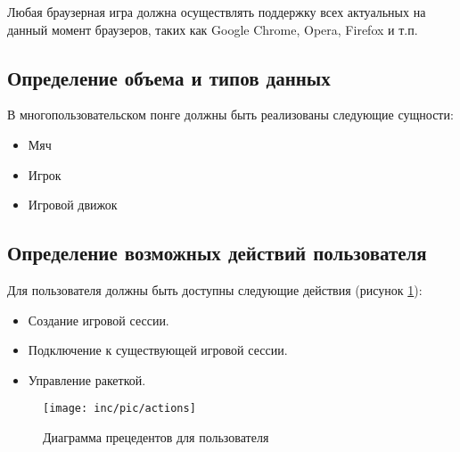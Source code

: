 Любая браузерная игра должна осуществлять поддержку всех актуальных на данный момент браузеров, таких как Google Chrome, Opera, Firefox и т.п.

\subsection{Определение объема и типов данных}

В многопользовательском понге должны быть реализованы следующие сущности:

\begin{itemize}
	\item Мяч
	\item Игрок
	\item Игровой движок
\end{itemize}

\subsection{Определение возможных действий пользователя}

Для пользователя должны быть доступны следующие действия (рисунок \ref{actions}):

\begin{itemize}
	\item Создание игровой сессии.
	\item Подключение к существующей игровой сессии.
	\item Управление ракеткой.
\end{itemize}

\begin{figure}
	\centering
	\texttt{[image: inc/pic/actions]}
	\caption{Диаграмма прецедентов для пользователя}
	\label{actions}
\end{figure}


